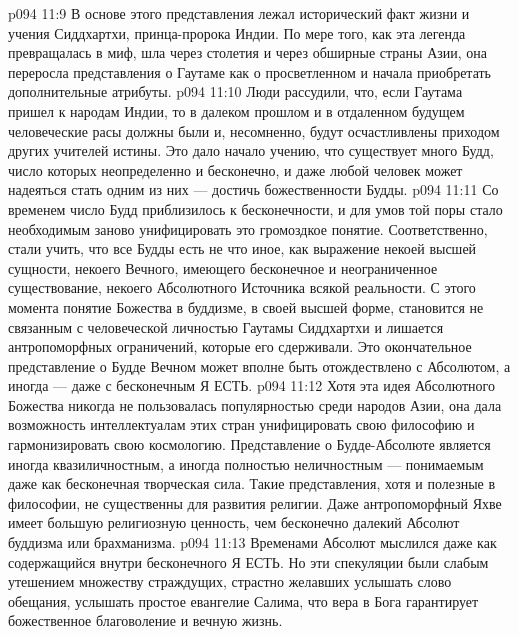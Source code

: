 \vs p094 11:9 \bibnobreakspace {} В основе этого представления лежал исторический факт жизни и учения Сиддхартхи, принца\hyp{}пророка Индии. По мере того, как эта легенда превращалась в миф, шла через столетия и через обширные страны Азии, она переросла представления о Гаутаме как о просветленном и начала приобретать дополнительные атрибуты.
\vs p094 11:10 \bibnobreakspace {} Люди рассудили, что, если Гаутама пришел к народам Индии, то в далеком прошлом и в отдаленном будущем человеческие расы должны были и, несомненно, будут осчастливлены приходом других учителей истины. Это дало начало учению, что существует много Будд, число которых неопределенно и бесконечно, и даже любой человек может надеяться стать одним из них --- достичь божественности Будды.
\vs p094 11:11 \bibnobreakspace {}  Со временем число Будд приблизилось к бесконечности, и для умов той поры стало необходимым заново унифицировать это громоздкое понятие. Соответственно, стали учить, что все Будды есть не что иное, как выражение некоей высшей сущности, некоего Вечного, имеющего бесконечное и неограниченное существование, некоего Абсолютного Источника всякой реальности. С этого момента понятие Божества в буддизме, в своей высшей форме, становится не связанным с человеческой личностью Гаутамы Сиддхартхи и лишается антропоморфных ограничений, которые его сдерживали. Это окончательное представление о Будде Вечном может вполне быть отождествлено с Абсолютом, а иногда --- даже с бесконечным Я ЕСТЬ.
\vs p094 11:12 \pc Хотя эта идея Абсолютного Божества никогда не пользовалась популярностью среди народов Азии, она дала возможность интеллектуалам этих стран унифицировать свою философию и гармонизировать свою космологию. Представление о Будде\hyp{}Абсолюте является иногда квазиличностным, а иногда полностью неличностным --- понимаемым даже как бесконечная творческая сила. Такие представления, хотя и полезные в философии, не существенны для развития религии. Даже антропоморфный Яхве имеет большую религиозную ценность, чем бесконечно далекий Абсолют буддизма или брахманизма.
\vs p094 11:13 Временами Абсолют мыслился даже как содержащийся внутри бесконечного Я ЕСТЬ. Но эти спекуляции были слабым утешением множеству страждущих, страстно желавших услышать слово обещания, услышать простое евангелие Салима, что вера в Бога гарантирует божественное благоволение и вечную жизнь.

